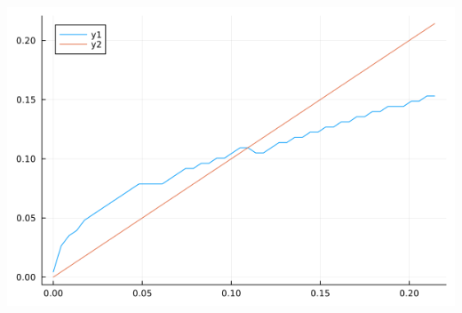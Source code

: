 \documentclass{article}
\begin{document}
\begin{center}
    \includegraphics[scale = 0.6]{capital.png}
\end{center}
\end{document}
